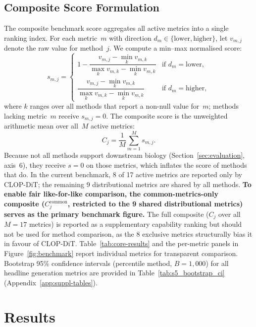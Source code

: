 \documentclass[preprint,12pt]{elsarticle}
\begin{document}
\subsection{Composite Score Formulation}\label{sec:composite}

The composite benchmark score aggregates all active metrics into a single ranking index. For each metric~$m$ with direction $d_m \in \{\text{lower}, \text{higher}\}$, let $v_{m,j}$ denote the raw value for method~$j$. We compute a min--max normalised score:
\begin{equation}
  s_{m,j} =
  \begin{cases}
    1 - \dfrac{v_{m,j} - \min_k v_{m,k}}{\max_k v_{m,k} - \min_k v_{m,k}} & \text{if } d_m = \text{lower},\\[6pt]
    \dfrac{v_{m,j} - \min_k v_{m,k}}{\max_k v_{m,k} - \min_k v_{m,k}} & \text{if } d_m = \text{higher},
  \end{cases}
  \label{eq:norm}
\end{equation}
where $k$ ranges over all methods that report a non-null value for~$m$; methods lacking metric~$m$ receive $s_{m,j} = 0$. The composite score is the unweighted arithmetic mean over all~$M$ active metrics:
\begin{equation}
  C_j = \frac{1}{M}\sum_{m=1}^{M} s_{m,j}.
  \label{eq:composite}
\end{equation}
Because not all methods support downstream biology (Section~\ref{sec:evaluation}, axis~6), they receive $s = 0$ on those metrics, which inflates the score of methods that do. In the current benchmark, 8 of 17 active metrics are reported only by CLOP-DiT; the remaining 9 distributional metrics are shared by all methods. \textbf{To enable fair like-for-like comparison, the common-metrics-only composite ($C_j^{\text{common}}$, restricted to the 9 shared distributional metrics) serves as the primary benchmark figure.} The full composite ($C_j$ over all $M = 17$ metrics) is reported as a supplementary capability ranking but should not be used for method comparison, as the 8 exclusive metrics structurally bias it in favour of CLOP-DiT. Table~\ref{tab:core-results} and the per-metric panels in Figure~\ref{fig:benchmark} report individual metrics for transparent comparison. Bootstrap 95\% confidence intervals (percentile method, $B{=}1{,}000$) for all headline generation metrics are provided in Table~\ref{tab:s5_bootstrap_ci} (Appendix~\ref{app:suppl-tables}).

\section{Results}\label{sec:results}
\end{document}
